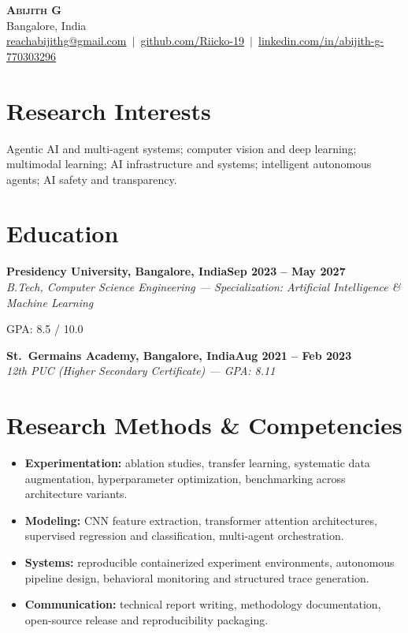 \documentclass[11pt,letterpaper]{article}
\newcommand{\entry}[3]{%
  \noindent\textbf{#1}\hfill\textbf{#2}\\[1pt]
  \textit{\small #3}\par\vspace{1pt}
}
\begin{document}
\begin{center}
  {\LARGE\bfseries\scshape Abijith G}\\[4pt]
  Bangalore, India\\[2pt]
  \href{mailto:reachabijithg@gmail.com}{reachabijithg@gmail.com} \,$\vert$\,
  \href{https://github.com/Riicko-19}{github.com/Riicko-19} \,$\vert$\,
  \href{https://linkedin.com/in/abijith-g-770303296}{linkedin.com/in/abijith-g-770303296}
\end{center}

\section{Research Interests}
Agentic AI and multi-agent systems; computer vision and deep learning; multimodal
learning; AI infrastructure and systems; intelligent autonomous agents; AI safety
and transparency.

\section{Education}
\entry{Presidency University, Bangalore, India}{Sep 2023 -- May 2027}
{B.Tech, Computer Science Engineering --- Specialization: Artificial Intelligence \& Machine Learning}
\vspace{1pt}
GPA: 8.5 / 10.0
\vspace{4pt}

\entry{St.\ Germains Academy, Bangalore, India}{Aug 2021 -- Feb 2023}
{12th PUC (Higher Secondary Certificate) --- GPA: 8.11}

\section{Research Methods \& Competencies}
\begin{itemize}
  \item \textbf{Experimentation:} ablation studies, transfer learning, systematic
        data augmentation, hyperparameter optimization, benchmarking across
        architecture variants.
  \item \textbf{Modeling:} CNN feature extraction, transformer attention
        architectures, supervised regression and classification, multi-agent
        orchestration.
  \item \textbf{Systems:} reproducible containerized experiment environments,
        autonomous pipeline design, behavioral monitoring and structured trace
        generation.
  \item \textbf{Communication:} technical report writing, methodology
        documentation, open-source release and reproducibility packaging.
\end{itemize}
\end{document}
